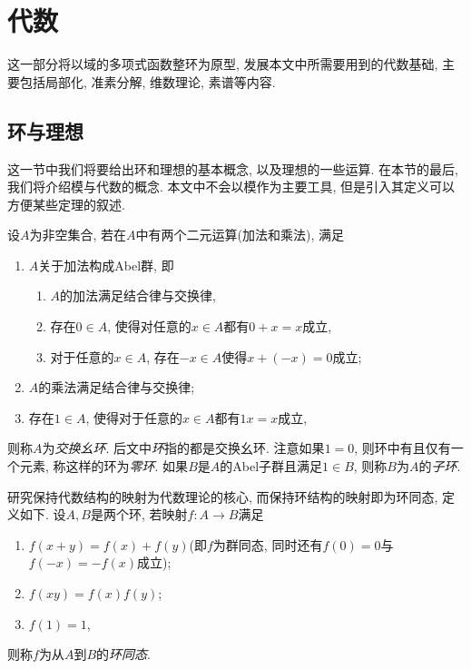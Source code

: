 
\section{代数}

这一部分将以域的多项式函数整环为原型, 发展本文中所需要用到的代数基础, 主要包括局部化, 准素分解, 维数理论, 素谱等内容.

\subsection{环与理想}\label{subsec:algebra-ring}

这一节中我们将要给出环和理想的基本概念, 以及理想的一些运算. 在本节的最后, 我们将介绍模与代数的概念. 本文中不会以模作为主要工具, 但是引入其定义可以方便某些定理的叙述.

设$A$为非空集合, 若在$A$中有两个二元运算(加法和乘法), 满足
\begin{enumerate}
  \item $A$关于加法构成Abel群, 即
  \begin{enumerate}
    \item $A$的加法满足结合律与交换律,
    \item 存在$0\in A$, 使得对任意的$x\in A$都有$0+x=x$成立,
    \item 对于任意的$x\in A$, 存在$-x\in A$使得$x+(-x)=0$成立;
  \end{enumerate}
  \item $A$的乘法满足结合律与交换律;
  \item 存在$1\in A$, 使得对于任意的$x\in A$都有$1x=x$成立,
\end{enumerate}
则称$A$为\emph{交换幺环}. 后文中\emph{环}指的都是交换幺环. 注意如果$1=0$, 则环中有且仅有一个元素, 称这样的环为\emph{零环}\footnotemark . 如果$B$是$A$的Abel子群且满足$1\in B$, 则称$B$为$A$的\emph{子环}.

研究保持代数结构的映射为代数理论的核心, 而保持环结构的映射即为环同态, 定义如下. 设$A, B$是两个环, 若映射$f\colon A\to B$满足
\begin{enumerate}
  \item $f(x+y)=f(x)+f(y)$(即$f$为群同态, 同时还有$f(0)=0$与$f(-x)=-f(x)$成立);
  \item $f(xy)=f(x)f(y)$;
  \item $f(1)=1$,
\end{enumerate}
则称$f$为从$A$到$B$的\emph{环同态}.

